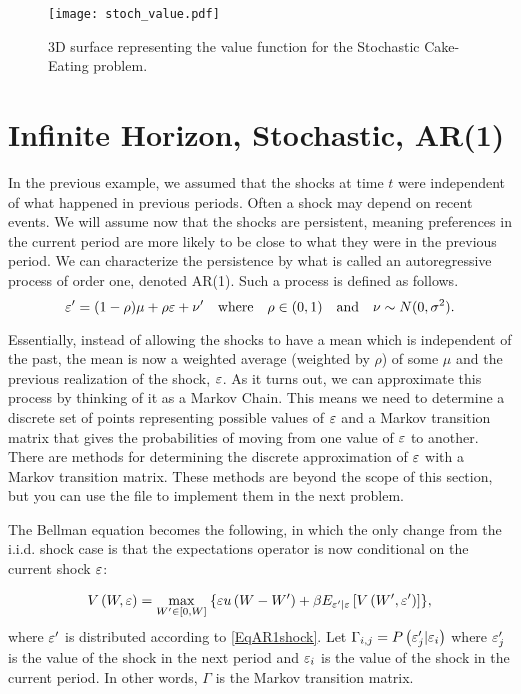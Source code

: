 \begin{figure}
    \centering
    \texttt{[image: stoch\_value.pdf]}
    \caption{3D surface representing the value function for the Stochastic Cake-Eating problem.}
\end{figure}

\section*{Infinite Horizon, Stochastic, AR(1)}\label{SecRecProbInfinHorStochAR1}

In the previous example, we assumed that the shocks at time $t$ were independent of what happened in
previous periods.  Often a shock may depend on recent events.  We will assume now that the shocks are persistent,
meaning preferences in the current period are more likely to be close to what they were in the previous period.
We can characterize the persistence by what is called an autoregressive process of order one, denoted AR(1).
Such a process is defined as follows.
\begin{equation}\label{EqAR1shock}
\varepsilon' = (1-\rho)\mu + \rho\varepsilon + \nu' \quad\text{where}\quad \rho\in(0,1) \quad\text{and}\quad \nu\sim N(0,\sigma^2).
\end{equation}

Essentially, instead of allowing the shocks to have a mean which is independent of the past, the mean is now a
weighted average (weighted by $\rho$) of some $\mu$ and the previous realization of the shock, $\varepsilon$.  As it turns
 out, we can approximate this process by thinking of it as a Markov Chain. This means we need to determine a
 discrete set of points representing possible values of $\varepsilon$ and a Markov transition matrix that gives the
 probabilities of moving from one value of $\varepsilon$ to another.  There are methods for determining the discrete
 approximation of $\varepsilon$ with a Markov transition matrix.  These methods are beyond the scope of this section,
 but you can use the file  to implement them in the next problem.

The Bellman equation becomes the following, in which the only change from the i.i.d. shock case is that the
expectations operator is now conditional on the current shock $\varepsilon$:

\begin{equation*}
   V\left(W,\varepsilon\right) = \max_{W'\in[0,W]}\: \{\varepsilon u\left(W - W'\right) +
   \beta E_{\varepsilon'|\varepsilon}\left[V\left(W',\varepsilon'\right)\right]\},
\end{equation*}
where $\varepsilon'$ is distributed according to \eqref{EqAR1shock}.
Let $\Gamma_{i,j}=P\left(\varepsilon_j'|\varepsilon_i\right)$ where $\varepsilon_j'$ is the value of the shock in
the next period and $\varepsilon_i$ is the value of the shock in the current period.
In other words, $\Gamma$ is the Markov transition matrix.

